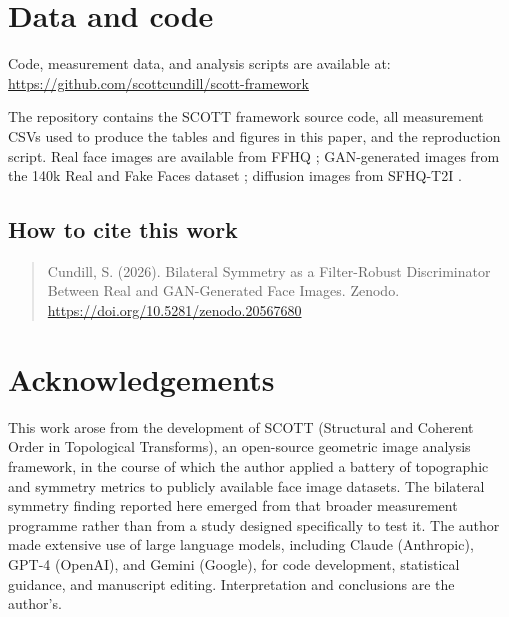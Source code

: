 \documentclass[11pt,a4paper]{article}
\begin{document}
\section{Data and code}

Code, measurement data, and analysis scripts are available at:
\url{https://github.com/scottcundill/scott-framework}

The repository contains the SCOTT framework source code, all measurement CSVs
used to produce the tables and figures in this paper, and the reproduction
script. Real face images are available from FFHQ \citep{karras2019style};
GAN-generated images from the 140k Real and Fake Faces dataset
\citep{xhlulu2020}; diffusion images from SFHQ-T2I \citep{beniaguev2024}.

\subsection*{How to cite this work}

\begin{quote}
Cundill, S. (2026). Bilateral Symmetry as a Filter-Robust Discriminator
Between Real and GAN-Generated Face Images. Zenodo.
\url{https://doi.org/10.5281/zenodo.20567680}
\end{quote}

\section*{Acknowledgements}

This work arose from the development of SCOTT (Structural and Coherent Order in
Topological Transforms), an open-source geometric image analysis framework, in
the course of which the author applied a battery of topographic and symmetry
metrics to publicly available face image datasets. The bilateral symmetry finding
reported here emerged from that broader measurement programme rather than from a
study designed specifically to test it. The author made extensive use of large
language models, including Claude (Anthropic), GPT-4 (OpenAI), and Gemini
(Google), for code development, statistical guidance, and manuscript editing.
Interpretation and conclusions are the author's.


\end{document}
